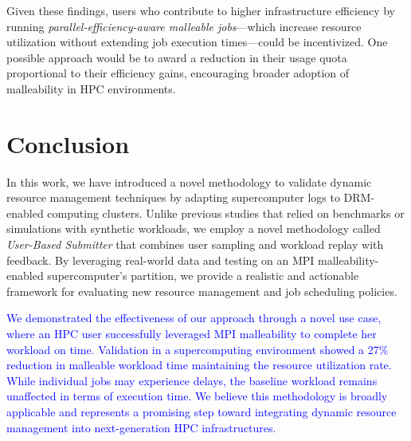 \documentclass[a4paper,fleqn]{cas-dc}
\newcommand{\review}[1]{\textcolor{blue}{#1}}
\begin{document}
Given these findings, users who contribute to higher infrastructure efficiency by running \textit{parallel-efficiency-aware malleable jobs}—which increase resource utilization without extending job execution times—could be incentivized. One possible approach would be to award a reduction in their usage quota proportional to their efficiency gains, encouraging broader adoption of malleability in HPC environments.  

\section{Conclusion}\label{sec:conclusion}
In this work, we have introduced a novel methodology to validate dynamic resource management techniques by adapting supercomputer logs to DRM-enabled computing clusters.
Unlike previous studies that relied on benchmarks or simulations with synthetic workloads, we employ a novel methodology called \textit{User-Based Submitter} that combines user sampling and workload replay with feedback.
By leveraging real-world data and testing on an MPI malleability-enabled supercomputer's partition, we provide a realistic and actionable framework for evaluating new resource management and job scheduling policies.

\review{
We demonstrated the effectiveness of our approach through a novel use case, where an HPC user successfully leveraged MPI malleability to complete her workload on time. Validation in a supercomputing environment showed a 27\% reduction in malleable workload time maintaining the resource utilization rate. While individual jobs may experience delays, the baseline workload remains unaffected in terms of execution time. We believe this methodology is broadly applicable and represents a promising step toward integrating dynamic resource management into next-generation HPC infrastructures.
}

\end{document}
